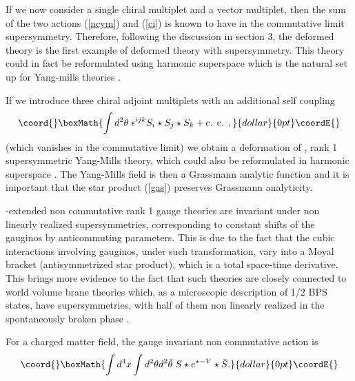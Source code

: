 \documentclass[a4paper,12pt]{article}
\begin{document}
 If we now consider   a single chiral multiplet and a vector   multiplet,
then the sum of the two actions
(\ref{ncym}) and (\ref{ci}) is known to have in the commutative limit
\coordHE{} supersymmetry. Therefore, 
following the discussion in section 3, the deformed theory is the first
example of 
deformed theory with \coordHE{} supersymmetry. This theory could in fact be
reformulated using harmonic superspace
which is the natural set up for \coordHE{} Yang-mills theories \cite{gikos}.


If we introduce three chiral adjoint multiplets \coordHE{}
with an additional  self coupling
$$\coord{}\boxMath{
\int d^2\theta \;\epsilon^{ijk}S_i\star S_j\star S_k +\mbox{c. c. },
}{dollar}{0pt}\coordE{}$$
(which vanishes in the commutative limit) we obtain a deformation of
\coordHE{}, rank 
1 supersymmetric Yang-Mills theory, which could also be reformulated in
harmonic superspace \cite{ka, hw}.
The Yang-Mills field is then a Grassmann analytic function \cite{gikos,
fs} 
and it is important that the star product 
(\ref{gas}) preserves Grassmann analyticity.

 \coordHE{}-extended non commutative rank 1 gauge theories are invariant under
\coordHE{} non linearly 
realized supersymmetries, corresponding to constant shifts of the gauginos
by anticommuting
 parameters. This is due to the fact that the  cubic interactions involving
gauginos, under such 
transformation, vary into a Moyal bracket (antisymmetrized star product),
which is a total 
space-time derivative. This brings more evidence to the fact that such
theories 
are closely connected to world volume brane theories which, as a
microscopic 
description of 1/2 BPS states, have \coordHE{} supersymmetries, with half of
them 
non linearly realized in the  spontaneously broken phase \cite{bg, t}.

For a charged matter field, the gauge invariant non commutative action is
$$\coord{}\boxMath{
\int d^4x \int d^2\theta d^2\bar\theta\; S\star e^{\star -V}\star\bar S.
}{dollar}{0pt}\coordE{}$$

\bigskip
\end{document}
